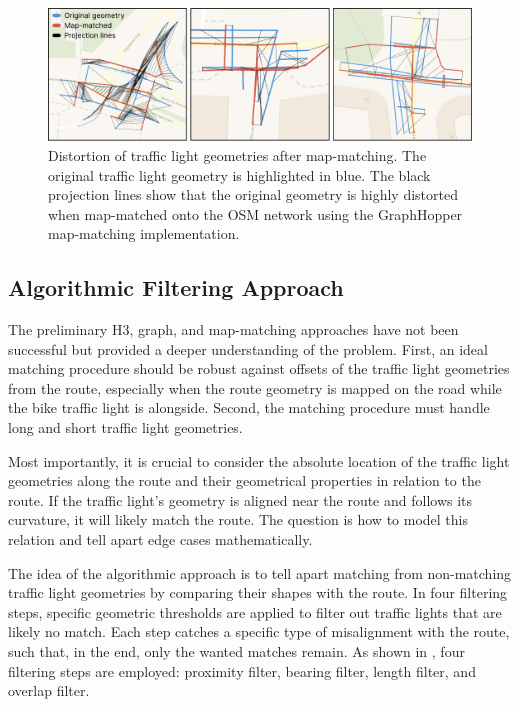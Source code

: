 \begin{figure}[t]
\centering
\includegraphics[width=\linewidth]{images/sg-selection-map-matching-fails.pdf}
\caption{Distortion of traffic light geometries after map-matching. The original traffic light geometry is highlighted in blue. The black projection lines show that the original geometry is highly distorted when map-matched onto the OSM network using the GraphHopper map-matching implementation.}
\label{fig:sg-selection-map-matching-fails}
\end{figure}

\subsection{Algorithmic Filtering Approach}

The preliminary H3, graph, and map-matching approaches have not been successful but provided a deeper understanding of the problem. First, an ideal matching procedure should be robust against offsets of the traffic light geometries from the route, especially when the route geometry is mapped on the road while the bike traffic light is alongside. Second, the matching procedure must handle long and short traffic light geometries.

Most importantly, it is crucial to consider the absolute location of the traffic light geometries along the route and their geometrical properties in relation to the route. If the traffic light's geometry is aligned near the route and follows its curvature, it will likely match the route. The question is how to model this relation and tell apart edge cases mathematically.

The idea of the algorithmic approach is to tell apart matching from non-matching traffic light geometries by comparing their shapes with the route. In four filtering steps, specific geometric thresholds are applied to filter out traffic lights that are likely no match. Each step catches a specific type of misalignment with the route, such that, in the end, only the wanted matches remain. As shown in , four filtering steps are employed: proximity filter, bearing filter, length filter, and overlap filter.

